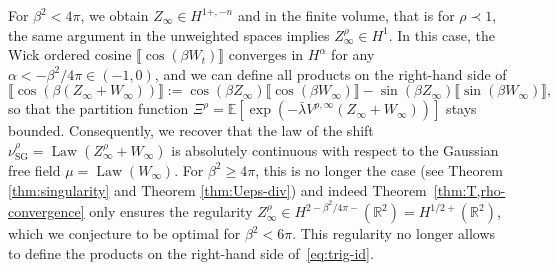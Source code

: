 \documentclass[11pt, a4paper]{scrartcl}
\numberwithin{equation}{section}
\theoremstyle{plain}
\theoremstyle{remark}
\newcommand{\assign}{:=}
\newcommand{\tmop}[1]{\ensuremath{\operatorname{#1}}}
\begin{document}
For $\beta^2 < 4 \pi$, we obtain $Z_{\infty} \in H^{1 +, - n}$ and in the
finite volume, that is for $\rho \prec 1$, the same argument in the unweighted
spaces implies $Z^{\rho}_{\infty} \in H^1$. In this case, the Wick ordered cosine $\llbracket \cos (\beta W_t) \rrbracket$
converges in $H^{\alpha}$ for any $\alpha < - \beta^2 / 4 \pi\in (-1,0)$, and we can define
all products on the right-hand side of
\begin{equation}
	\llbracket \cos (\beta (Z_{\infty} + W_{\infty})) \rrbracket \assign \cos
	(\beta Z_{\infty}) \llbracket \cos (\beta W_{\infty}) \rrbracket - \sin
	(\beta Z_{\infty}) \llbracket \sin (\beta W_{\infty}) \rrbracket,
	\label{eq:trig-id}
\end{equation}
so that the partition function $\Xi^{\rho} =\mathbb{E} [\exp (- \bar{\lambda}
		V^{\rho, \infty} (Z_{\infty} + W_{\infty}))]$ stays bounded. Consequently, we
recover that the law of the shift $\nu_{\tmop{SG}}^{\rho} = \tmop{Law}
	(Z_{\infty}^{\rho} + W_{\infty})$ is absolutely continuous with respect to the
Gaussian free field $\mu = \tmop{Law} (W_{\infty})$. For $\beta^2 \geqslant 4
	\pi$, this is no longer the case (see Theorem \ref{thm:singularity} and
Theorem \ref{thm:Ueps-div}) and indeed Theorem~\ref{thm:T,rho-convergence}
only ensures the regularity $Z^{\rho}_{\infty} \in H^{2 - \beta^2 / 4 \pi -}
	(\mathbb{R}^2) = H^{1 / 2 +} (\mathbb{R}^2)$, which we conjecture to be
optimal for $\beta^2<6\pi$. This regularity no longer allows to define the products on the right-hand side of~\eqref{eq:trig-id}.
\end{document}
